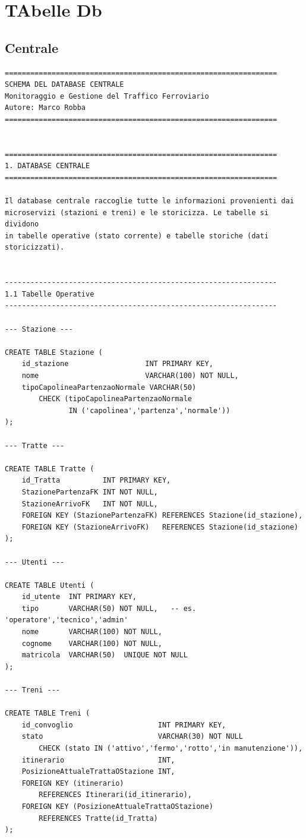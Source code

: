 \documentclass[11pt]{article}
\begin{document}
\section{TAbelle Db}
\label{sec:org4b0acb5}
\subsection{Centrale}
\label{sec:org9df4627}
\begin{verbatim}
================================================================
SCHEMA DEL DATABASE CENTRALE
Monitoraggio e Gestione del Traffico Ferroviario
Autore: Marco Robba
================================================================


================================================================
1. DATABASE CENTRALE
================================================================

Il database centrale raccoglie tutte le informazioni provenienti dai
microservizi (stazioni e treni) e le storicizza. Le tabelle si dividono
in tabelle operative (stato corrente) e tabelle storiche (dati
storicizzati).


----------------------------------------------------------------
1.1 Tabelle Operative
----------------------------------------------------------------

--- Stazione ---

CREATE TABLE Stazione (
    id_stazione                  INT PRIMARY KEY,
    nome                         VARCHAR(100) NOT NULL,
    tipoCapolineaPartenzaoNormale VARCHAR(50)
        CHECK (tipoCapolineaPartenzaoNormale
               IN ('capolinea','partenza','normale'))
);

--- Tratte ---

CREATE TABLE Tratte (
    id_Tratta          INT PRIMARY KEY,
    StazionePartenzaFK INT NOT NULL,
    StazioneArrivoFK   INT NOT NULL,
    FOREIGN KEY (StazionePartenzaFK) REFERENCES Stazione(id_stazione),
    FOREIGN KEY (StazioneArrivoFK)   REFERENCES Stazione(id_stazione)
);

--- Utenti ---

CREATE TABLE Utenti (
    id_utente  INT PRIMARY KEY,
    tipo       VARCHAR(50) NOT NULL,   -- es. 'operatore','tecnico','admin'
    nome       VARCHAR(100) NOT NULL,
    cognome    VARCHAR(100) NOT NULL,
    matricola  VARCHAR(50)  UNIQUE NOT NULL
);

--- Treni ---

CREATE TABLE Treni (
    id_convoglio                    INT PRIMARY KEY,
    stato                           VARCHAR(30) NOT NULL
        CHECK (stato IN ('attivo','fermo','rotto','in manutenzione')),
    itinerario                      INT,
    PosizioneAttualeTrattaOStazione INT,
    FOREIGN KEY (itinerario)
        REFERENCES Itinerari(id_itinerario),
    FOREIGN KEY (PosizioneAttualeTrattaOStazione)
        REFERENCES Tratte(id_Tratta)
);


\end{verbatim}
\end{document}
